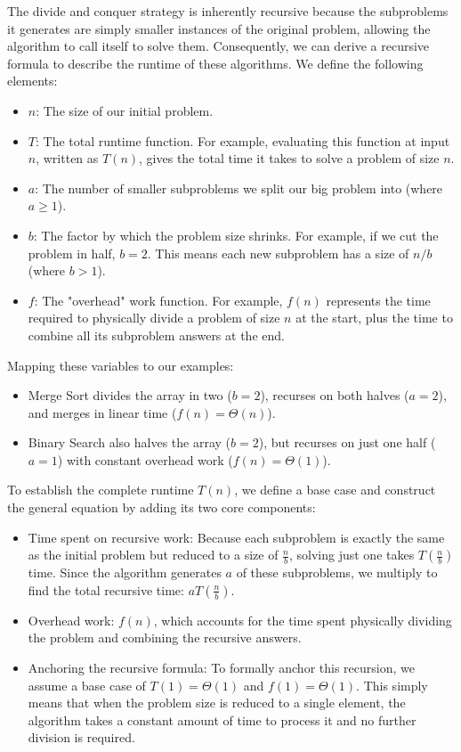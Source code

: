 \documentclass[11pt, a4paper]{article}
\begin{document}
The divide and conquer strategy is inherently recursive because the subproblems it generates are simply smaller instances of the original problem, allowing the algorithm to call itself to solve them. Consequently, we can derive a recursive formula to describe the runtime of these algorithms. We define the following elements:
\begin{itemize}
    \item $n$: The size of our initial problem.
    \item $T$: The total runtime function. For example, evaluating this function at input $n$, written as $T(n)$, gives the total time it takes to solve a problem of size $n$.
    \item $a$: The number of smaller subproblems we split our big problem into (where $a \ge 1$).
    \item $b$: The factor by which the problem size shrinks. For example, if we cut the problem in half, $b = 2$. This means each new subproblem has a size of $n/b$ (where $b > 1$).
    \item $f$: The "overhead" work function. For example, $f(n)$ represents the time required to physically divide a problem of size $n$ at the start, plus the time to combine all its subproblem answers at the end.
\end{itemize}
\newpage
Mapping these variables to our examples:
\begin{itemize}
    \item Merge Sort divides the array in two ($b=2$), recurses on both halves ($a=2$), and merges in linear time ($f(n) = \Theta(n)$).

    \item  Binary Search also halves the array ($b=2$), but recurses on just one half ($a=1$) with constant overhead work ($f(n) = \Theta(1)$).
\end{itemize}


To establish the complete runtime $T(n)$, we define a base case and construct the general equation by adding its two core components:

\begin{itemize}
    \item Time spent on recursive work: Because each subproblem is exactly the same as the initial problem but reduced to a size of $\frac{n}{b}$, solving just one takes $T\left(\frac{n}{b}\right)$ time. Since the algorithm generates $a$ of these subproblems, we multiply to find the total recursive time: $aT\left(\frac{n}{b}\right)$.

    \item Overhead work: $f(n)$, which accounts for the time spent physically dividing the problem and combining the recursive answers. 

    \item Anchoring the recursive formula: To formally anchor this recursion, we assume a base case of $T(1) = \Theta(1)$ and $f(1) = \Theta(1)$. This simply means that when the problem size is reduced to a single element, the algorithm takes a constant amount of time to process it and no further division is required.
\end{itemize}
\end{document}
